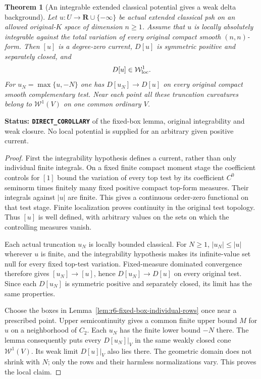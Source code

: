 \documentclass[11pt,a4paper]{article}
\numberwithin{equation}{section}
\newtheorem{theorem}{Theorem}[section]
\theoremstyle{definition}
\theoremstyle{remark}
\begin{document}
\begin{theorem}[An integrable extended classical potential gives a weak delta background]
\label{thm:r6-integrable-classical-delta-background}
Let $u:U\to\mathbf R\cup\{-\infty\}$ be actual extended classical
psh on an allowed original-$K$ space of dimension $n\ge1$. Assume
that $u$ is locally absolutely integrable against the total variation
of every original compact smooth $(n,n)$-form. Then $[u]$ is a
degree-zero current, $D[u]$ is symmetric positive and separately
closed, and
\[
                              D[u]\in\mathcal W^1_{\rm loc}.
\]
For $u_N=\max\{u,-N\}$ one has $D[u_N]\to D[u]$ on every
original compact smooth complementary test. Near each point all
these truncation curvatures belong to $\mathcal W^1(V)$ on one
common ordinary $V$.
\end{theorem}

\noindent\textbf{Status: \texttt{DIRECT\_COROLLARY}} of the
fixed-box lemma, original integrability and weak closure. No local
potential is supplied for an arbitrary given positive current.

\begin{proof}
First the integrability hypothesis defines a current, rather than
only individual finite integrals. On a fixed finite compact moment
stage the coefficient controls for $[1]$ bound the variation of every
top test by its coefficient $C^0$ seminorm times finitely many fixed
positive compact top-form measures. Their integrals against $|u|$
are finite. This gives a continuous order-zero functional on that
test stage. Finite localization proves continuity in the original
test topology. Thus $[u]$ is well defined, with arbitrary values on
the sets on which the controlling measures vanish.

Each actual truncation $u_N$ is locally bounded classical. For
$N\ge1$, $|u_N|\le|u|$ wherever $u$ is finite, and the
integrability hypothesis makes its infinite-value set null for
every fixed top-test variation. Fixed-measure dominated convergence
therefore gives $[u_N]\to[u]$, hence $D[u_N]\to D[u]$ on
every original test. Since each $D[u_N]$ is symmetric positive
and separately closed, its limit has the same properties.

Choose the boxes in Lemma~\ref{lem:r6-fixed-box-individual-rows}
once near a prescribed point. Upper semicontinuity gives a common
finite upper bound $M$ for $u$ on a neighborhood of $C_2$. Each
$u_N$ has the finite lower bound $-N$ there. The lemma consequently
puts every $D[u_N]|_V$ in the same weakly closed cone
$\mathcal W^1(V)$. Its weak limit $D[u]|_V$ also lies there.
The geometric domain does not shrink with $N$; only the rows and
their harmless normalizations vary. This proves the local claim.
\end{proof}
\end{document}
